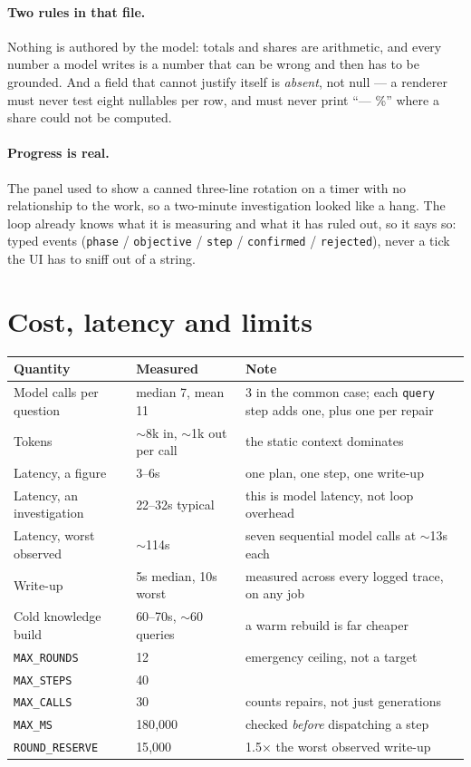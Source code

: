\documentclass[11pt,a4paper]{report}
\newcommand{\code}[1]{\texttt{\small #1}}
\begin{document}
\paragraph{Two rules in that file.} Nothing is authored by the model: totals and shares are
arithmetic, and every number a model writes is a number that can be wrong and then has to be
grounded. And a field that cannot justify itself is \emph{absent}, not null --- a renderer must
never test eight nullables per row, and must never print ``--- \%'' where a share could not be
computed.

\paragraph{Progress is real.} The panel used to show a canned three-line rotation on a timer with no
relationship to the work, so a two-minute investigation looked like a hang. The loop already knows
what it is measuring and what it has ruled out, so it says so: typed events
(\code{phase} / \code{objective} / \code{step} / \code{confirmed} / \code{rejected}), never a tick
the UI has to sniff out of a string.

\section{Cost, latency and limits}

\begin{center}
\small
\begin{tabular}{@{}p{4.4cm}p{4.2cm}p{5.8cm}@{}}
\toprule
\textbf{Quantity} & \textbf{Measured} & \textbf{Note}\\
\midrule
Model calls per question & median 7, mean 11 & 3 in the common case; each \code{query} step adds
 one, plus one per repair\\
Tokens & $\sim$8k in, $\sim$1k out per call & the static context dominates\\
Latency, a figure & 3--6s & one plan, one step, one write-up\\
Latency, an investigation & 22--32s typical & this is model latency, not loop overhead\\
Latency, worst observed & $\sim$114s & seven sequential model calls at $\sim$13s each\\
Write-up & 5s median, 10s worst & measured across every logged trace, on any job\\
Cold knowledge build & 60--70s, $\sim$60 queries & a warm rebuild is far cheaper\\
\midrule
\code{MAX\_ROUNDS} & 12 & emergency ceiling, not a target\\
\code{MAX\_STEPS} & 40 & \\
\code{MAX\_CALLS} & 30 & counts repairs, not just generations\\
\code{MAX\_MS} & 180{,}000 & checked \emph{before} dispatching a step\\
\code{ROUND\_RESERVE} & 15{,}000 & 1.5$\times$ the worst observed write-up\\
\bottomrule
\end{tabular}
\end{center}
\end{document}
